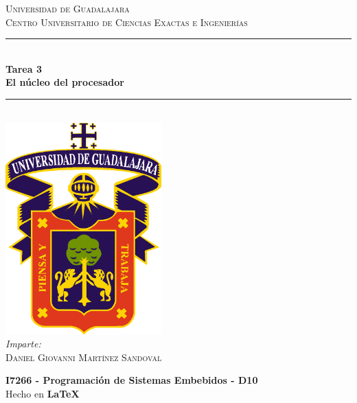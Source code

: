 \documentclass[11pt,letterpaper]{article}
\newcommand{\HRule}{\rule{\linewidth}{0.5mm}} %
\begin{document}

\begin{titlepage}
    \center
    
    \textsc{\LARGE Universidad de Guadalajara}\\[0.2cm] %
    \textsc{Centro Universitario de Ciencias Exactas e Ingenierías}\\[1cm]
    
    \HRule \\[0.3cm]
    { 
        \LARGE \textbf{Tarea 3} \\[0.3cm]
        \large \textbf{El núcleo del procesador} \\[0.3cm]
    }
    \HRule \\[2cm]
    
    \includegraphics[width=6cm]{logo_udg_color.eps}\\[1.25cm] %
    
    \center
    \vspace{1cm}
    \emph{Imparte:} \\ %
    \textsc{Daniel Giovanni Martínez Sandoval} 
    
    \vfill
    \textbf{I7266 - Programación de Sistemas Embebidos - D10} \\
    Hecho en \textbf{\LaTeX}	
\end{titlepage}




\end{document}
